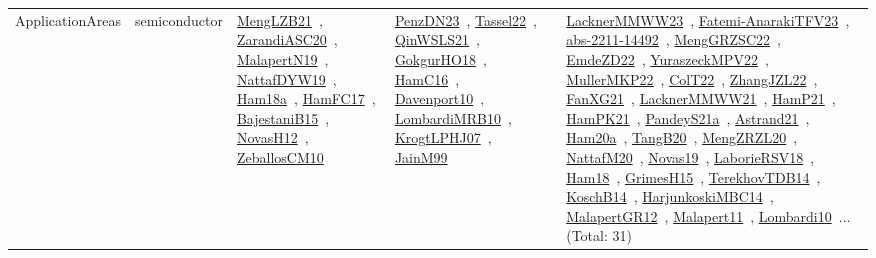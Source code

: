 {\begin{longtable}{lp{3cm}>{\raggedright\arraybackslash}p{6cm}>{\raggedright\arraybackslash}p{6cm}>{\raggedright\arraybackslash}p{8cm}}
\index{semiconductor}\index{ApplicationAreas!semiconductor}ApplicationAreas & semiconductor & \href{../works/MengLZB21.pdf}{MengLZB21}~\cite{MengLZB21}, \href{../works/ZarandiASC20.pdf}{ZarandiASC20}~\cite{ZarandiASC20}, \href{../works/MalapertN19.pdf}{MalapertN19}~\cite{MalapertN19}, \href{../works/NattafDYW19.pdf}{NattafDYW19}~\cite{NattafDYW19}, \href{../works/Ham18a.pdf}{Ham18a}~\cite{Ham18a}, \href{../works/HamFC17.pdf}{HamFC17}~\cite{HamFC17}, \href{../works/BajestaniB15.pdf}{BajestaniB15}~\cite{BajestaniB15}, \href{../works/NovasH12.pdf}{NovasH12}~\cite{NovasH12}, \href{../works/ZeballosCM10.pdf}{ZeballosCM10}~\cite{ZeballosCM10} & \href{../works/PenzDN23.pdf}{PenzDN23}~\cite{PenzDN23}, \href{../works/Tassel22.pdf}{Tassel22}~\cite{Tassel22}, \href{../works/QinWSLS21.pdf}{QinWSLS21}~\cite{QinWSLS21}, \href{../works/GokgurHO18.pdf}{GokgurHO18}~\cite{GokgurHO18}, \href{../works/HamC16.pdf}{HamC16}~\cite{HamC16}, \href{../works/Davenport10.pdf}{Davenport10}~\cite{Davenport10}, \href{../works/LombardiMRB10.pdf}{LombardiMRB10}~\cite{LombardiMRB10}, \href{../works/KrogtLPHJ07.pdf}{KrogtLPHJ07}~\cite{KrogtLPHJ07}, \href{../works/JainM99.pdf}{JainM99}~\cite{JainM99} & \href{../works/LacknerMMWW23.pdf}{LacknerMMWW23}~\cite{LacknerMMWW23}, \href{../works/Fatemi-AnarakiTFV23.pdf}{Fatemi-AnarakiTFV23}~\cite{Fatemi-AnarakiTFV23}, \href{../works/abs-2211-14492.pdf}{abs-2211-14492}~\cite{abs-2211-14492}, \href{../works/MengGRZSC22.pdf}{MengGRZSC22}~\cite{MengGRZSC22}, \href{../works/EmdeZD22.pdf}{EmdeZD22}~\cite{EmdeZD22}, \href{../works/YuraszeckMPV22.pdf}{YuraszeckMPV22}~\cite{YuraszeckMPV22}, \href{../works/MullerMKP22.pdf}{MullerMKP22}~\cite{MullerMKP22}, \href{../works/ColT22.pdf}{ColT22}~\cite{ColT22}, \href{../works/ZhangJZL22.pdf}{ZhangJZL22}~\cite{ZhangJZL22}, \href{../works/FanXG21.pdf}{FanXG21}~\cite{FanXG21}, \href{../works/LacknerMMWW21.pdf}{LacknerMMWW21}~\cite{LacknerMMWW21}, \href{../works/HamP21.pdf}{HamP21}~\cite{HamP21}, \href{../works/HamPK21.pdf}{HamPK21}~\cite{HamPK21}, \href{../works/PandeyS21a.pdf}{PandeyS21a}~\cite{PandeyS21a}, \href{../works/Astrand21.pdf}{Astrand21}~\cite{Astrand21}, \href{../works/Ham20a.pdf}{Ham20a}~\cite{Ham20a}, \href{../works/TangB20.pdf}{TangB20}~\cite{TangB20}, \href{../works/MengZRZL20.pdf}{MengZRZL20}~\cite{MengZRZL20}, \href{../works/NattafM20.pdf}{NattafM20}~\cite{NattafM20}, \href{../works/Novas19.pdf}{Novas19}~\cite{Novas19}, \href{../works/LaborieRSV18.pdf}{LaborieRSV18}~\cite{LaborieRSV18}, \href{../works/Ham18.pdf}{Ham18}~\cite{Ham18}, \href{../works/GrimesH15.pdf}{GrimesH15}~\cite{GrimesH15}, \href{../works/TerekhovTDB14.pdf}{TerekhovTDB14}~\cite{TerekhovTDB14}, \href{../works/KoschB14.pdf}{KoschB14}~\cite{KoschB14}, \href{../works/HarjunkoskiMBC14.pdf}{HarjunkoskiMBC14}~\cite{HarjunkoskiMBC14}, \href{../works/MalapertGR12.pdf}{MalapertGR12}~\cite{MalapertGR12}, \href{../works/Malapert11.pdf}{Malapert11}~\cite{Malapert11}, \href{../works/Lombardi10.pdf}{Lombardi10}~\cite{Lombardi10}... (Total: 31)\\

\end{longtable}}
